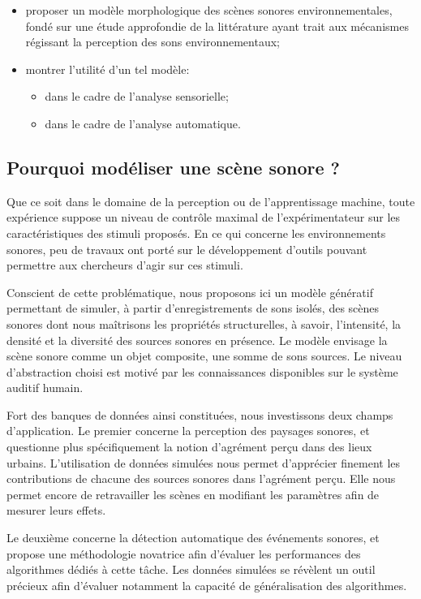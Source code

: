 \begin{itemize}
\item proposer un modèle morphologique des scènes sonores environnementales, fondé sur une étude approfondie de la littérature ayant trait aux mécanismes régissant la perception des sons environnementaux;
\item montrer l'utilité d'un tel modèle: 
\begin{itemize}
\item dans le cadre de l'analyse sensorielle;
\item dans le cadre de l'analyse automatique.
\end{itemize} 
\end{itemize}

\subsection{Pourquoi modéliser une scène sonore ?}

Que ce soit dans le domaine de la perception ou de l'apprentissage machine, toute expérience suppose un niveau de contrôle maximal de l'expérimentateur sur les caractéristiques des stimuli proposés. En ce qui concerne les environnements sonores, peu de travaux ont porté sur le développement d’outils pouvant permettre aux chercheurs d'agir sur ces stimuli.

Conscient de cette problématique, nous proposons ici un modèle génératif permettant de simuler, à partir d'enregistrements de sons isolés, des scènes sonores dont nous maîtrisons les propriétés structurelles, à savoir, l'intensité, la densité et la diversité des sources sonores en présence. Le modèle envisage la scène sonore comme un objet composite, une somme de sons sources. Le niveau d'abstraction choisi est motivé par les connaissances disponibles sur le système auditif humain.

Fort des banques de données ainsi constituées, nous investissons deux champs d'application. Le premier concerne la perception des paysages sonores, et questionne plus spécifiquement la notion d'agrément perçu dans des lieux urbains. L'utilisation de données simulées nous permet d'apprécier finement les contributions de chacune des sources sonores dans l'agrément perçu. Elle nous permet encore de retravailler les scènes en modifiant les paramètres afin de mesurer leurs effets.

Le deuxième concerne la détection automatique des événements sonores, et propose une méthodologie novatrice afin d'évaluer les performances des algorithmes dédiés à cette tâche. Les données simulées se révèlent un outil précieux afin d'évaluer notamment la capacité de généralisation des algorithmes.

